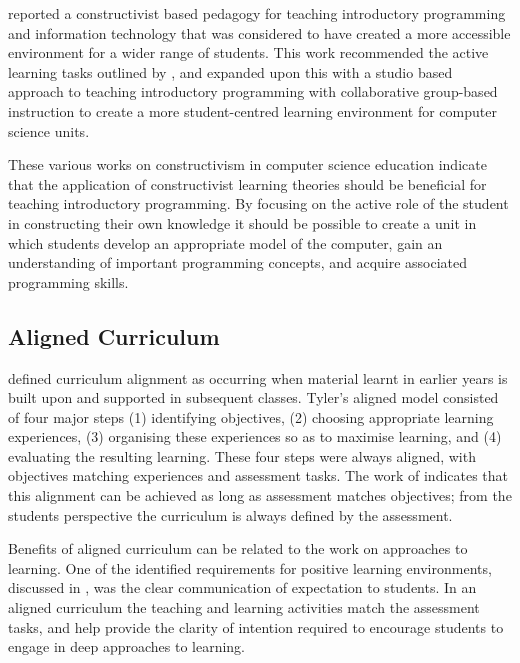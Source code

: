 \citet{Wulf:2005} reported a constructivist based pedagogy for teaching introductory programming and information technology that was considered to have created a more accessible environment for a wider range of students. This work recommended the active learning tasks outlined by \citet{VanGorp:2001}, and expanded upon this with a studio based approach to teaching introductory programming with collaborative group-based instruction to create a more student-centred learning environment for computer science units.

These various works on constructivism in computer science education indicate that the application of constructivist learning theories should be beneficial for teaching introductory programming. By focusing on the active role of the student in constructing their own knowledge it should be possible to create a unit in which students develop an appropriate model of the computer, gain an understanding of important programming concepts, and acquire associated programming skills.


\subsection{Aligned Curriculum} %
\label{sub:aligned_curriculum}

\citet{Tyler:1969} defined curriculum alignment as occurring when material learnt in earlier years is built upon and supported in subsequent classes. Tyler's aligned model consisted of four major steps (1) identifying objectives, (2) choosing appropriate learning experiences, (3) organising these experiences so as to maximise learning, and (4) evaluating the resulting learning. These four steps were always aligned, with objectives matching experiences and assessment tasks. The work of \cite{Ramsden:1992} indicates that this alignment can be achieved as long as assessment matches objectives; from the students perspective the curriculum is always defined by the assessment.

Benefits of aligned curriculum can be related to the work on approaches to learning. One of the identified requirements for positive learning environments, discussed in , was the clear communication of expectation to students. In an aligned curriculum the teaching and learning activities match the assessment tasks, and help provide the clarity of intention required to encourage students to engage in deep approaches to learning.

